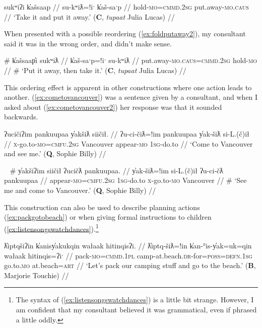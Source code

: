 \ex \label{ex:foldputaway1}
\begingl
\glpreamble sukʷiʔi k̓ašsaap //
\gla su-kʷiƛ=!iˑ k̓aš-saˑp //
\glb hold-\textsc{mo}=\textsc{cmmd.2sg} put.away-\textsc{mo.caus} //
\glft `Take it and put it away.' (\textbf{C}, \textit{tupaat} Julia Lucas) //
\endgl
\xe

When presented with a possible reordering (\ref{ex:foldputaway2}), my consultant said it was in the wrong order, and didn't make sense.

\ex \label{ex:foldputaway2}
\begingl
\glpreamble \# k̓ašsaap̓i sukʷiƛ //
\gla k̓aš-saˑp=!iˑ su-kʷiƛ //
\glb put.away-\textsc{mo.caus}=\textsc{cmmd.2sg} hold-\textsc{mo} //
\glft \# `Put it away, then take it.' (\textbf{C}, \textit{tupaat} Julia Lucas) //
\endgl
\xe

This ordering effect is apparent in other constructions where one action leads to another. (\ref{ex:cometovancouver}) was a sentence given by a consultant, and when I asked about (\ref{ex:cometovancouver2}) her response was that it sounded backwards.

\ex \label{ex:cometovancouver}
\begingl
\glpreamble ʔucičiʔim pankuupaa y̓akšiƛ siičił. //
\gla ʔu-ci-čiƛ=!im pankuupaa y̓ak-šiƛ si-L.(č)ił //
\glb \textsc{x}-go.to-\textsc{mo}=\textsc{cmfu.2sg} Vancouver appear-\textsc{mo} \textsc{1sg}-do.to //
\glft `Come to Vancouver and see me.' (\textbf{Q}, Sophie Billy) //
\endgl
\xe

\ex~ \label{ex:cometovancouver2}
\begingl
\glpreamble \# y̓akšiʔim siičił ʔucičƛ pankuupaa. //
\gla y̓ak-šiƛ=!im si-L.(č)ił ʔu-ci-čƛ pankuupaa //
\glb appear-\textsc{mo}=\textsc{cmfu.2sg} \textsc{1sg}-do.to \textsc{x}-go.to-\textsc{mo} Vancouver //
\glft \# `See me and come to Vancouver.' (\textbf{Q}, Sophie Billy) //
\endgl
\xe

This construction can also be used to describe planning actions (\ref{ex:packgotobeach}) or when giving formal instructions to children (\ref{ex:listensongswatchdances}).\footnote{The syntax of (\ref{ex:listensongswatchdances}) is a little bit strange. However, I am confident that my consultant believed it was grammatical, even if phrased a little oddly.}

\ex \label{ex:packgotobeach}
\begingl
\glpreamble ƛ̓iptqšiʔin k̓anisy̓akukqin wałaak hitinqisʔi. //
\gla ƛ̓iptq-šiƛ=!in k̓an-°is-y̓ak=uk=qin wałaak hitinqis=ʔiˑ //
\glb pack-\textsc{mo}=\textsc{cmmd.1pl} camp-at.beach.\textsc{dr}-for=\textsc{poss}=\textsc{defn.1sg} go.to.\textsc{mo} at.beach=\textsc{art} //
\glft `Let's pack our camping stuff and go to the beach.' (\textbf{B}, Marjorie Touchie) //
\endgl
\xe

